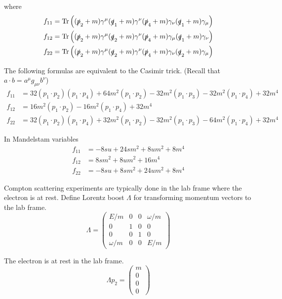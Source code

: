 where
\begin{align*}
f_{11}&=\operatorname{Tr}
\left(
(\slashed{p}_2+m)\gamma^\mu(\slashed{q}_1+m)\gamma^\nu(\slashed{p}_4+m)\gamma_\nu(\slashed{q}_1+m)\gamma_\mu
\right)
\\
f_{12}&=\operatorname{Tr}
\left(
(\slashed{p}_2+m)\gamma^\mu(\slashed{q}_2+m)\gamma^\nu(\slashed{p}_4+m)\gamma_\mu(\slashed{q}_1+m)\gamma_\nu
\right)
\\
f_{22}&=\operatorname{Tr}
\left(
(\slashed{p}_2+m)\gamma^\mu(\slashed{q}_2+m)\gamma^\nu(\slashed{p}_4+m)\gamma_\nu(\slashed{q}_2+m)\gamma_\mu
\right)
\end{align*}

The following formulas are equivalent to the Casimir trick.
(Recall that $a\cdot b=a^\mu g_{\mu\nu}b^\nu$)
\begin{align*}
f_{11}&=
 32 (p_1 \cdot p_2) (p_1 \cdot p_4) +
 64 m^2 (p_1 \cdot p_2) -
 32 m^2 (p_1 \cdot p_3) -
 32 m^2 (p_1 \cdot p_4) + 32 m^4
\\
f_{12}&=16 m^2 (p_1 \cdot p_2) - 16 m^2 (p_1 \cdot p_4) + 32m^4
\\
f_{22}&=
32 (p_1 \cdot p_2) (p_1 \cdot p_4) +
32 m^2 (p_1 \cdot p_2) -
32 m^2 (p_1 \cdot p_3) -
64 m^2 (p_1 \cdot p_4) + 32 m^4
\end{align*}

In Mandelstam variables
\begin{equation*}
\begin{aligned}
f_{11}&=-8 s u + 24 s m^2 + 8 u m^2 + 8 m^4
\\
f_{12}&=8 s m^2 + 8 u m^2 + 16 m^4
\\
f_{22}&=-8 s u + 8 s m^2 + 24 u m^2 + 8 m^4
\end{aligned}
\tag{2}
\end{equation*}

Compton scattering experiments are typically done in the lab frame where the electron is at rest.
Define Lorentz boost $\Lambda$ for transforming momentum vectors to the lab frame.
\begin{equation*}
\Lambda=
\begin{pmatrix}
E/m & 0 & 0 & \omega/m\\
0 & 1 & 0 & 0\\
0 & 0 & 1 & 0\\
\omega/m & 0 & 0 & E/m
\end{pmatrix}
\end{equation*}

The electron is at rest in the lab frame.
\begin{equation*}
\Lambda p_2=\begin{pmatrix}m\\0\\0\\0\end{pmatrix}
\end{equation*}

